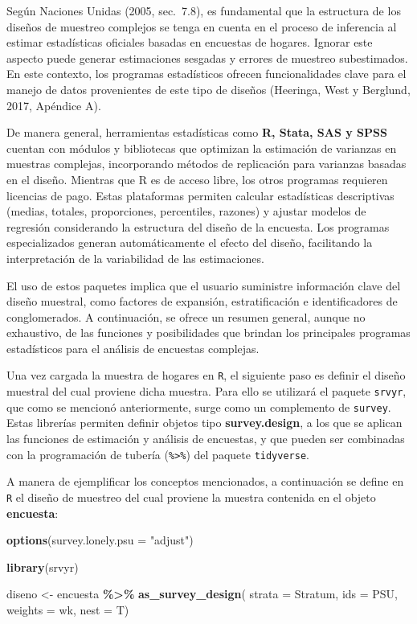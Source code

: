\documentclass[
  12pt,
]{book}
\newenvironment{Shaded}{\begin{snugshade}}{\end{snugshade}}
\newcommand{\AttributeTok}[1]{\textcolor[rgb]{0.13,0.29,0.53}{#1}}
\newcommand{\FunctionTok}[1]{\textcolor[rgb]{0.13,0.29,0.53}{\textbf{#1}}}
\newcommand{\NormalTok}[1]{#1}
\newcommand{\OtherTok}[1]{\textcolor[rgb]{0.56,0.35,0.01}{#1}}
\newcommand{\SpecialCharTok}[1]{\textcolor[rgb]{0.81,0.36,0.00}{\textbf{#1}}}
\newcommand{\StringTok}[1]{\textcolor[rgb]{0.31,0.60,0.02}{#1}}
\begin{document}
Según Naciones Unidas (2005, sec.~7.8), es fundamental que la estructura de los diseños de muestreo complejos se tenga en cuenta en el proceso de inferencia al estimar estadísticas oficiales basadas en encuestas de hogares. Ignorar este aspecto puede generar estimaciones sesgadas y errores de muestreo subestimados. En este contexto, los programas estadísticos ofrecen funcionalidades clave para el manejo de datos provenientes de este tipo de diseños (Heeringa, West y Berglund, 2017, Apéndice A).

De manera general, herramientas estadísticas como \textbf{R, Stata, SAS y SPSS} cuentan con módulos y bibliotecas que optimizan la estimación de varianzas en muestras complejas, incorporando métodos de replicación para varianzas basadas en el diseño. Mientras que R es de acceso libre, los otros programas requieren licencias de pago. Estas plataformas permiten calcular estadísticas descriptivas (medias, totales, proporciones, percentiles, razones) y ajustar modelos de regresión considerando la estructura del diseño de la encuesta. Los programas especializados generan automáticamente el efecto del diseño, facilitando la interpretación de la variabilidad de las estimaciones.

El uso de estos paquetes implica que el usuario suministre información clave del diseño muestral, como factores de expansión, estratificación e identificadores de conglomerados. A continuación, se ofrece un resumen general, aunque no exhaustivo, de las funciones y posibilidades que brindan los principales programas estadísticos para el análisis de encuestas complejas.

Una vez cargada la muestra de hogares en \texttt{R}, el siguiente paso es definir el diseño muestral del cual proviene dicha muestra. Para ello se utilizará el paquete \texttt{srvyr}, que como se mencionó anteriormente, surge como un complemento de \texttt{survey}. Estas librerías permiten definir objetos tipo \textbf{survey.design}, a los que se aplican las funciones de estimación y análisis de encuestas, y que pueden ser combinadas con la programación de tubería (\texttt{\%\textgreater{}\%}) del paquete \texttt{tidyverse}.

A manera de ejemplificar los conceptos mencionados, a continuación se define en \texttt{R} el diseño de muestreo del cual proviene la muestra contenida en el objeto \textbf{encuesta}:

\begin{Shaded}
\begin{Highlighting}[]
\FunctionTok{options}\NormalTok{(}\AttributeTok{survey.lonely.psu =} \StringTok{"adjust"}\NormalTok{) }

\FunctionTok{library}\NormalTok{(srvyr)}

\NormalTok{diseno }\OtherTok{\textless{}{-}}\NormalTok{ encuesta }\SpecialCharTok{\%\textgreater{}\%} 
  \FunctionTok{as\_survey\_design}\NormalTok{(}
    \AttributeTok{strata =}\NormalTok{ Stratum,  }
    \AttributeTok{ids =}\NormalTok{ PSU,        }
    \AttributeTok{weights =}\NormalTok{ wk,      }
    \AttributeTok{nest =}\NormalTok{ T)}
\end{Highlighting}
\end{Shaded}
\end{document}

